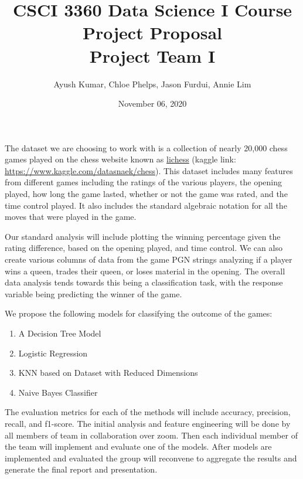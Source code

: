 \documentclass{article}
\title{CSCI 3360 Data Science I Course Project Proposal\\
		Project Team I}
\author{Ayush Kumar, Chloe Phelps, Jason Furdui, Annie Lim}
\date{November 06, 2020}
\begin{document}
	
	\maketitle
	
	The dataset we are choosing to work with is a collection of nearly 20,000 chess games played on the chess website known as \href{https://lichess.org}{lichess} (kaggle link: \url{https://www.kaggle.com/datasnaek/chess}). This dataset includes many features from different games including the ratings of the various players, the opening played, how long the game lasted, whether or not the game was rated, and the time control played. It also includes the standard algebraic notation for all the moves that were played in the game. 
	
	Our standard analysis will include plotting the winning percentage given the rating difference, based on the opening played, and time control. We can also create various columns of data from the game PGN strings analyzing if a player wins a queen, trades their queen, or loses material in the opening. The overall data analysis tends towards this being a classification task, with the response variable being predicting the winner of the game. 
	
	We propose the following models for classifying the outcome of the games: 
	
	\begin{enumerate}
		\item A Decision Tree Model 
		\item Logistic Regression 
		\item KNN based on Dataset with Reduced Dimensions 
		\item Naive Bayes Classifier 
	\end{enumerate}
	
	The evaluation metrics for each of the methods will include accuracy, precision, recall, and f1-score. The initial analysis and feature engineering will be done by all members of team in collaboration over zoom. Then each individual member of the team will implement and evaluate one of the models. After models are implemented and evaluated the group will reconvene to aggregate the results and generate the final report and presentation. 
\end{document}
